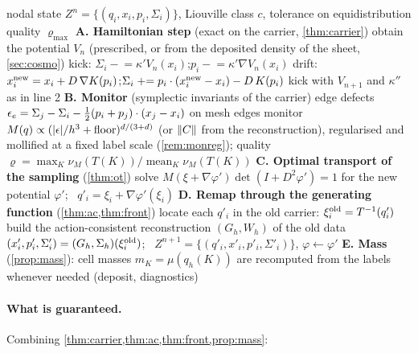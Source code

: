\begin{algorithm}[h]
\caption{SHAI-HULUD: one macro-step (evolution, monitor, optimal-transport remap)}\label{alg:sh}
\begin{algorithmic}[1]
\Require nodal state $Z^n=\{(q_i,x_i,p_i,\Sigma_i)\}$, Liouville class $c$, tolerance on equidistribution quality $\varrho_{\max}$
\Statex \textbf{A. Hamiltonian step} (exact on the carrier, \cref{thm:carrier})
\State obtain the potential $V_n$ (prescribed, or from the deposited density of the sheet, \cref{sec:cosmo})
\State kick: $\Sigma_i\mathrel{-}=\kappa'V_n(x_i)$;\quad $p_i\mathrel{-}=\kappa'\nabla V_n(x_i)$ 
\State drift: $x_i^{\rm new}=x_i+D\,\nabla K(p_i)$;\quad $\Sigma_i\mathrel{+}=p_i\cdot(x_i^{\rm new}-x_i)-D\,K(p_i)$ 
\State kick with $V_{n+1}$ and $\kappa''$ as in line 2
\Statex \textbf{B. Monitor} (symplectic invariants of the carrier)
\State edge defects $\epsilon_e=\Sigma_j-\Sigma_i-\tfrac12(p_i+p_j)\cdot(x_j-x_i)$ on mesh edges 
\State monitor $M(q)\propto(\lvert \epsilon\rvert/h^3+\text{floor})^{d/(3+d)}$ (or $\lVert C\rVert$ from the reconstruction), regularised and mollified at a fixed label scale (\cref{rem:monreg}); quality $\varrho=\max_K\nu_M(T(K))/\operatorname{mean}_K\nu_M(T(K))$
\Statex \quad\textbf{C. Optimal transport of the sampling} (\cref{thm:ot})
\State solve $M(\xi+\nabla\varphi')\det(I+D^2\varphi')=1$ for the new potential $\varphi'$; \ $q'_i=\xi_i+\nabla\varphi'(\xi_i)$
\Statex \quad\textbf{D. Remap through the generating function} (\cref{thm:ac,thm:front})
\State locate each $q'_i$ in the old carrier: $\xi_i^{\rm old}=T^{-1}(q'_i)$ 
\State build the action-consistent reconstruction $(G_h,W_h)$ of the old data 
\State $(x'_i,p'_i,\Sigma'_i)=(G_h,\Sigma_h)(\xi_i^{\rm old})$; \ $Z^{n+1}=\{(q'_i,x'_i,p'_i,\Sigma'_i)\}$, $\varphi\leftarrow\varphi'$
\EndIf
\Statex \textbf{E. Mass} (\cref{prop:mass}): cell masses $m_K=\mu(q_h(K))$ are recomputed from the labels whenever needed (deposit, diagnostics)
\end{algorithmic}
\end{algorithm}

\paragraph{What is guaranteed.} Combining \cref{thm:carrier,thm:ac,thm:front,prop:mass}:

